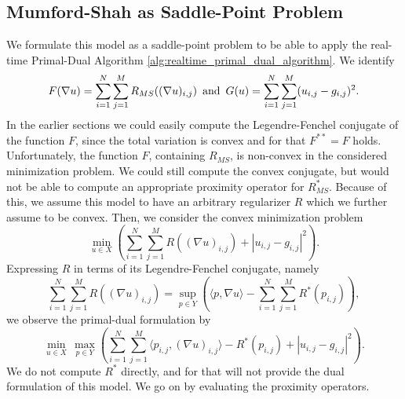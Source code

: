 \documentclass[abstracton]{scrreprt}
\begin{document}
        \subsection{Mumford-Shah as Saddle-Point Problem} %
        \label{sub:mumford_shah_as_saddle_point_problem}
            We formulate this model as a saddle-point problem to be able to apply the real-time Primal-Dual Algorithm \ref{alg:realtime_primal_dual_algorithm}. We identify
                $$
                    F(\nabla u) = \sum\limits_{i = 1}^{N} \sum\limits_{j = 1}^{M} R_{MS}((\nabla u)_{i,j}) \,\,\, \textnormal{and} \,\,\, G(u) = \sum\limits_{i = 1}^{N} \sum\limits_{j = 1}^{M} (u_{i,j} - g_{i,j})^{2}.
                $$
            In the earlier sections we could easily compute the Legendre-Fenchel conjugate of the function $F$, since the total variation is convex and for that $F^{\ast\ast} = F$ holds. Unfortunately, the function $F$, containing $R_{MS}$, is non-convex in the considered minimization problem. We could still compute the convex conjugate, but would not be able to compute an appropriate proximity operator for $R_{MS}^{\ast}$. Because of this, we assume this  model to have an arbitrary regularizer $R$ which we further assume to be convex. Then, we consider the convex minimization problem
                $$
                    \min_{u \in X} \left( \sum_{i = 1}^{N} \sum_{j = 1}^{M} R((\nabla u)_{i,j}) + |u_{i,j} - g_{i,j}|^{2} \right).
                $$
            Expressing $R$ in terms of its Legendre-Fenchel conjugate, namely
                $$
                    \sum_{i = 1}^{N} \sum_{j = 1}^{M} R((\nabla u)_{i,j}) = \sup\limits_{p \in Y} \left( \langle p, \nabla u \rangle - \sum_{i = 1}^{N} \sum_{j = 1}^{M} R^{\ast}(p_{i,j}) \right),
                $$
            we observe the primal-dual formulation by
                $$
                    \min_{u \in X}\, \max_{p \in Y} \left( \sum_{i = 1}^{N} \sum_{j = 1}^{M} \langle p_{i,j}, (\nabla u)_{i,j} \rangle - R^{\ast}(p_{i,j}) + |u_{i,j} - g_{i,j}|^{2} \right).
                $$
            We do not compute $R^{\ast}$ directly, and for that will not provide the dual formulation of this model. We go on by evaluating the proximity operators.
\end{document}
